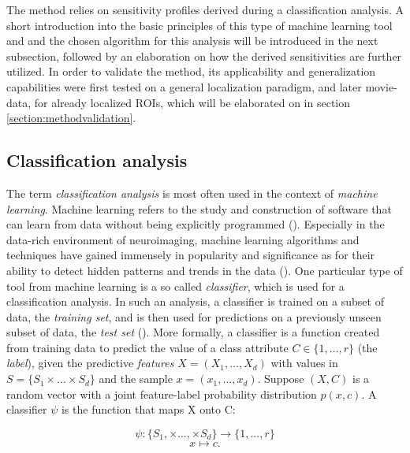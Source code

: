 \documentclass[a4paper, 12pt]{scrreprt}
\begin{document}
The method relies on sensitivity profiles derived during a classification analysis. A short introduction into the basic principles of this type of machine learning tool and and the chosen algorithm for this analysis will be introduced in the next subsection, followed by an elaboration on how the derived sensitivities are further utilized. In order to validate the method, its applicability and generalization capabilities were first tested on a general localization paradigm, and later movie-data, for already localized ROIs, which will be elaborated on in section \ref{section:methodvalidation}.



\subsection{Classification analysis}
The term \textit{classification analysis} is most often used in the context of \textit{machine learning}. Machine learning refers to the study and construction of software that can learn from data without being explicitly programmed (\cite{zeigermann2018machine}). Especially in the data-rich environment of neuroimaging, machine learning algorithms and techniques have gained immensely in popularity and significance as for their ability to detect hidden patterns and trends in the data (\cite{vogt2018machine}). One particular type of tool from machine learning is a so called \textit{classifier}, which is used for a classification analysis. In such an analysis, a classifier is trained on a subset of data, the \textit{training set}, and is then used for predictions on a previously unseen subset of data, the \textit{test set} (\cite{zeigermann2018machine}). \newline
More formally, a classifier is a function created from training data to predict the value of a class attribute $C \in \{1, \ldots, r\}$ (the \textit{label}), given the predictive \textit{features} $X = (X_1, \ldots, X_d)$  with values in $S = \{S_1 \times \ldots \times S_d\}$ and the sample $x = (x_1, \ldots, x_d)$. Suppose $(X, C)$ is a random vector with a joint feature-label probability distribution $p(x, c)$. A classifier $\psi$ is the function that maps X onto C:

\begin{equation}\label{classifier}
\psi:\{ S_1, \times \ldots, \times S_d \} \rightarrow \{1, ..., r\}
\end{equation}
\begin{equation}
x \mapsto c.
\end{equation}
\end{document}

